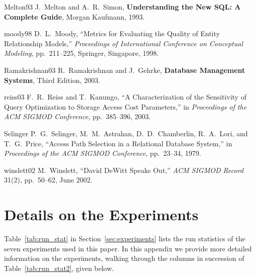 \documentclass[prodmode,acmtods]{acmsmall}
\begin{document}
\begin{thebibliography}{99}
\bibitem
{Melton93}
J.~Melton and A.~R.~Simon, {\bf Understanding the New SQL: A Complete
  Guide}, Morgan Kaufmann, 1993.

\bibitem
{moody98} D.~L.~Moody, ``Metrics for Evaluating the Quality of Entity
Relationship Models,'' {\em Proceedings of International Conference on
  Conceptual Modeling}, pp.~211--225, Springer, Singapore, 1998.

\bibitem
{Ramakrishnan03}
R.~Ramakrishnan and J.~Gehrke, {\bf Database Management Systems}, Third
Edition, 2003.

\bibitem
{reiss03}
F.~R.~Reiss and T.~Kanungo, ``A Characterization of the Sensitivity of Query
Optimization to Storage Access Cost Parameters,'' in {\em Proceedings of the
  ACM SIGMOD Conference}, pp.~385--396, 2003.

\bibitem
{Selinger}
P.~G.~Selinger, M.~M.~Astrahan, D.~D.~Chamberlin, R.~A.~Lori, and
T.~G.~Price, ``Access Path Selection in a Relational Database System,''
in {\em Proceedings of the ACM SIGMOD Conference}, pp.~23--34, 1979.

\bibitem
{winslett02}
M.~Winslett, ``David DeWitt Speaks Out,'' {\em ACM SIGMOD
  Record} 31(2), pp.~50--62, June 2002. 



\end{thebibliography}

\newpage
\appendix
\section{Details on the Experiments}\label{sec:app}
Table~\ref{tab:run_stat} in Section~\ref{sec:experiments} lists the run statistics of the seven experiments
  used in this \hbox{paper}. In this appendix we provide more detailed information
  on the experiments, walking through the columns in succession of
Table~\ref{tab:run_stat2}, given below.
\end{document}

